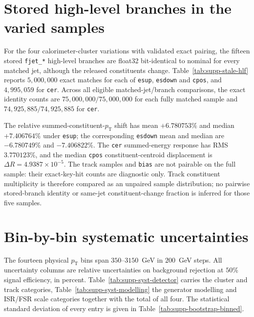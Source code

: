 \documentclass[11pt,a4paper,onecolumn]{article}
\newcommand{\pt}{p_{\mathrm{T}}}
\begin{document}
\clearpage
\section{Stored high-level branches in the varied samples}

For the four calorimeter-cluster variations with validated exact pairing, the
fifteen stored \texttt{fjet\_*} high-level branches are float32 bit-identical to
nominal for every matched jet, although the released constituents change.
Table~\ref{tab:supp-stale-hlf} reports $5{,}000{,}000$ exact matches for each of
\texttt{esup}, \texttt{esdown} and \texttt{cpos}, and $4{,}995{,}059$ for
\texttt{cer}. Across all eligible matched-jet/branch comparisons, the exact
identity counts are $75{,}000{,}000/75{,}000{,}000$ for each fully matched
sample and $74{,}925{,}885/74{,}925{,}885$ for \texttt{cer}.

The relative summed-constituent-$\pt$ shift has mean $+6.780753\%$ and median
$+7.406764\%$ under \texttt{esup}; the corresponding \texttt{esdown} mean and
median are $-6.780749\%$ and $-7.406822\%$. The \texttt{cer} summed-energy
response has RMS $3.770123\%$, and the median \texttt{cpos}
constituent-centroid displacement is $\Delta R=4.9387\times10^{-5}$.
The track samples and \texttt{bias} are not pairable on the full sample:
their exact-key-hit counts are diagnostic only. Track constituent
multiplicity is therefore compared as an unpaired sample distribution;
no pairwise stored-branch identity or same-jet constituent-change fraction
is inferred for those five samples.



\section{Bin-by-bin systematic uncertainties}

The fourteen physical $\pt$ bins span $350$--$3150$~GeV in $200$~GeV steps. All
uncertainty columns are relative uncertainties on background rejection at $50\%$
signal efficiency, in percent. Table~\ref{tab:supp-syst-detector} carries the
cluster and track categories, Table~\ref{tab:supp-syst-modelling} the generator
modelling and ISR/FSR scale categories together with the total of all four. The
statistical standard deviation of every entry is given in
Table~\ref{tab:supp-bootstrap-binned}.




\end{document}
